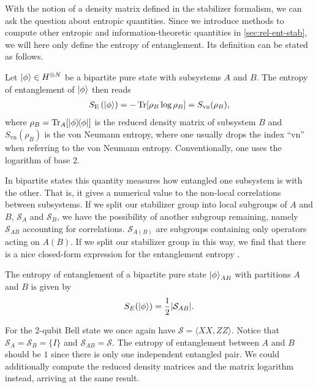 With the notion of a density matrix defined in the stabilizer formalism, we can
ask the question about entropic quantities. Since we introduce methods to
compute other entropic and information-theoretic quantities in
\cref{sec:rel-ent-stab}, we will here only define the entropy of entanglement.
Its definition can be stated as follows.
\begin{defn}\label{defn:entent}
  Let $\ket{\phi}\in H^{\otimes N}$ be a bipartite pure state with subsystems
  $A$ and $B$. The entropy of entanglement of $\ket{\phi}$ then reads
  \begin{align}
    S_\mathrm{E}\left(\ket{\phi}\right) = - \Tr[\rho_B \log \rho_B] =
    S_\mathrm{vn}(\rho_B),
  \end{align}
  where $\rho_B = \Tr_A[\dyad{\phi}]$ is the reduced density matrix of subsystem
  $B$ and $S_\mathrm{vn}(\rho_B)$ is the von Neumann entropy, where one usually
  drops the index \enquote{vn} when referring to the von Neumann entropy. Conventionally, one uses the logarithm of base 2.
\end{defn}

In bipartite states this quantity measures how entangled one subsystem is with
the other. That is, it gives a numerical value to the non-local correlations between
subsystems. If we split our stabilizer group into local subgroups of $A$ and
$B$, $\mathcal{S}_A$ and $\mathcal{S}_B$, we have the possibility of another
subgroup remaining, namely $\mathcal{S}_{AB}$ accounting for correlations.
$\mathcal{S}_{A(B)}$ are subgroups containing only operators acting on $A (B)$.
If we split our stabilizer group in this way, we find that there is a nice
closed-form expression for the entanglement entropy
\cite{fattalEntanglementStabilizerFormalism2004}.

\begin{thm}\label{thm:entent}
  The entropy of entanglement of a bipartite pure state $\ket{\phi}_{AB}$ with
  partitions $A$ and $B$ is given
  by
  \begin{align}\label{eq:entent}
    S_E(\ket{\phi}) = \frac{1}{2}\abs{\mathcal{S}_{AB}}
  .\end{align}
\end{thm}
For
the 2-qubit Bell state we once again have $\mathcal{S} = \langle XX,
ZZ\rangle$. Notice that $\mathcal{S}_A = \mathcal{S}_B = \{I\}$ and $\mathcal{S}_{AB} =
\mathcal{S}$. 
The entropy of entanglement between $A$ and $B$ should be $1$
since there is only one independent entangled pair. We could additionally compute
the reduced density matrices and the matrix logarithm instead, arriving at the
same result.

